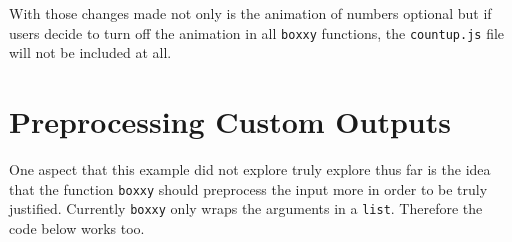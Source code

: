 \documentclass[
]{krantz}
\makeatletter
\newenvironment{Shaded}{\begin{snugshade}}{\end{snugshade}}
\newcommand{\ControlFlowTok}[1]{\textcolor[rgb]{0.27,0.27,0.27}{\textbf{#1}}}
\newcommand{\DataTypeTok}[1]{\textcolor[rgb]{0.27,0.27,0.27}{#1}}
\newcommand{\DecValTok}[1]{\textcolor[rgb]{0.06,0.06,0.06}{#1}}
\newcommand{\KeywordTok}[1]{\textcolor[rgb]{0.27,0.27,0.27}{\textbf{#1}}}
\newcommand{\NormalTok}[1]{#1}
\newcommand{\OperatorTok}[1]{\textcolor[rgb]{0.43,0.43,0.43}{\textbf{#1}}}
\newcommand{\OtherTok}[1]{\textcolor[rgb]{0.37,0.37,0.37}{#1}}
\newcommand{\StringTok}[1]{\textcolor[rgb]{0.5,0.5,0.5}{#1}}
\newenvironment{kframe}{%
\medskip{}
\setlength{\fboxsep}{.8em}
 \def\at@end@of@kframe{}%
 \ifinner\ifhmode%
  \def\at@end@of@kframe{\end{minipage}}%
  \begin{minipage}{\columnwidth}%
 \fi\fi%
 \def\FrameCommand##1{\hskip\@totalleftmargin \hskip-\fboxsep
 \colorbox{shadecolor}{##1}\hskip-\fboxsep
     \hskip-\linewidth \hskip-\@totalleftmargin \hskip\columnwidth}%
 \MakeFramed {\advance\hsize-\width
   \@totalleftmargin\z@ \linewidth\hsize
   \@setminipage}}%
 {\par\unskip\endMakeFramed%
 \at@end@of@kframe}
\renewenvironment{Shaded}{\begin{kframe}}{\end{kframe}}
\makeatother
\begin{document}
With those changes made not only is the animation of numbers optional but if users decide to turn off the animation in all \texttt{boxxy} functions, the \texttt{countup.js} file will not be included at all.

\begin{Shaded}
\end{Shaded}

\hypertarget{shiny-output-preprocess}{%
\section{Preprocessing Custom Outputs}\label{shiny-output-preprocess}}

One aspect that this example did not explore truly explore thus far is the idea that the function \texttt{boxxy} should preprocess the input more in order to be truly justified. Currently \texttt{boxxy} only wraps the arguments in a \texttt{list}. Therefore the code below works too.
\end{document}
